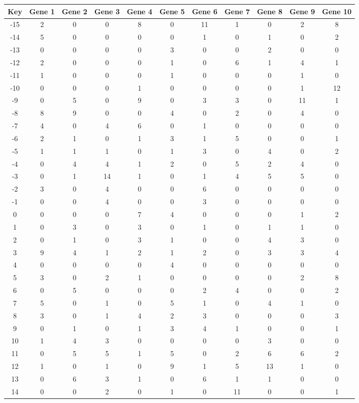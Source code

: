 \begin{tabular}{|c|c|c|c|c|c|c|c|c|c|c|}
\hline
Key & Gene 1 & Gene 2 & Gene 3 & Gene 4 & Gene 5 & Gene 6 & Gene 7 & Gene 8 & Gene 9 & Gene 10 \\
\hline
-15 & 2 & 0 & 0 & 8 & 0 & 11 & 1 & 0 & 2 & 8 \\
-14 & 5 & 0 & 0 & 0 & 0 & 1 & 0 & 1 & 0 & 2 \\
-13 & 0 & 0 & 0 & 0 & 3 & 0 & 0 & 2 & 0 & 0 \\
-12 & 2 & 0 & 0 & 0 & 1 & 0 & 6 & 1 & 4 & 1 \\
-11 & 1 & 0 & 0 & 0 & 1 & 0 & 0 & 0 & 1 & 0 \\
-10 & 0 & 0 & 0 & 1 & 0 & 0 & 0 & 0 & 1 & 12 \\
-9 & 0 & 5 & 0 & 9 & 0 & 3 & 3 & 0 & 11 & 1 \\
-8 & 8 & 9 & 0 & 0 & 4 & 0 & 2 & 0 & 4 & 0 \\
-7 & 4 & 0 & 4 & 6 & 0 & 1 & 0 & 0 & 0 & 0 \\
-6 & 2 & 1 & 0 & 1 & 3 & 1 & 5 & 0 & 0 & 1 \\
-5 & 1 & 1 & 1 & 0 & 1 & 3 & 0 & 4 & 0 & 2 \\
-4 & 0 & 4 & 4 & 1 & 2 & 0 & 5 & 2 & 4 & 0 \\
-3 & 0 & 1 & 14 & 1 & 0 & 1 & 4 & 5 & 5 & 0 \\
-2 & 3 & 0 & 4 & 0 & 0 & 6 & 0 & 0 & 0 & 0 \\
-1 & 0 & 0 & 4 & 0 & 0 & 3 & 0 & 0 & 0 & 0 \\
0 & 0 & 0 & 0 & 7 & 4 & 0 & 0 & 0 & 1 & 2 \\
1 & 0 & 3 & 0 & 3 & 0 & 1 & 0 & 1 & 1 & 0 \\
2 & 0 & 1 & 0 & 3 & 1 & 0 & 0 & 4 & 3 & 0 \\
3 & 9 & 4 & 1 & 2 & 1 & 2 & 0 & 3 & 3 & 4 \\
4 & 0 & 0 & 0 & 0 & 4 & 0 & 0 & 0 & 0 & 0 \\
5 & 3 & 0 & 2 & 1 & 0 & 0 & 0 & 0 & 2 & 8 \\
6 & 0 & 5 & 0 & 0 & 0 & 2 & 4 & 0 & 0 & 2 \\
7 & 5 & 0 & 1 & 0 & 5 & 1 & 0 & 4 & 1 & 0 \\
8 & 3 & 0 & 1 & 4 & 2 & 3 & 0 & 0 & 0 & 3 \\
9 & 0 & 1 & 0 & 1 & 3 & 4 & 1 & 0 & 0 & 1 \\
10 & 1 & 4 & 3 & 0 & 0 & 0 & 0 & 3 & 0 & 0 \\
11 & 0 & 5 & 5 & 1 & 5 & 0 & 2 & 6 & 6 & 2 \\
12 & 1 & 0 & 1 & 0 & 9 & 1 & 5 & 13 & 1 & 0 \\
13 & 0 & 6 & 3 & 1 & 0 & 6 & 1 & 1 & 0 & 0 \\
14 & 0 & 0 & 2 & 0 & 1 & 0 & 11 & 0 & 0 & 1 \\
\hline
\end{tabular}